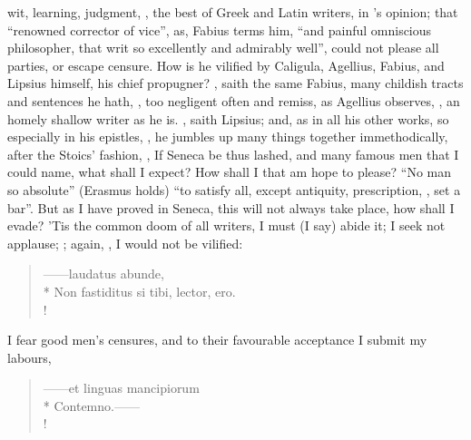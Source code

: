 wit, learning, judgment, , the
best of Greek and Latin writers, in 's opinion; that
\enquote{renowned corrector of vice}, as, Fabius terms him, \enquote{and
painful omniscious philosopher, that writ so excellently and admirably well},
could not please all parties, or escape censure. How is he vilified by
Caligula, Agellius, Fabius, and Lipsius himself, his
chief propugner? , saith the same Fabius, many
childish tracts and sentences he hath, , too negligent
often and remiss, as Agellius observes, , an homely shallow writer as
he is. , saith
Lipsius; and, as in all his other works, so especially in
his epistles, , he jumbles up many things
together immethodically, after the Stoics' fashion, , \etc{} If Seneca be thus lashed, and many famous men that I could
name, what shall I expect? How shall I that am 
hope to please? \enquote{No man so absolute} (Erasmus holds) \enquote{to
satisfy all, except antiquity, prescription, \etc{}, set a bar}. But as I have
proved in Seneca, this will not always take place, how shall I evade? 'Tis the
common doom of all writers, I must (I say) abide it; I seek not applause;
; again,
, I would not be vilified:

\begin{latin}
\begin{verse}%
------laudatus abunde,\\*
Non fastiditus si tibi, lector, ero.\\!
\end{verse}%
\end{latin}

I fear good men's censures, and to their favourable acceptance I submit my labours,

\begin{latin}
\begin{verse}%
------et linguas mancipiorum\\*
Contemno.------\\!
\end{verse}%
\end{latin}

